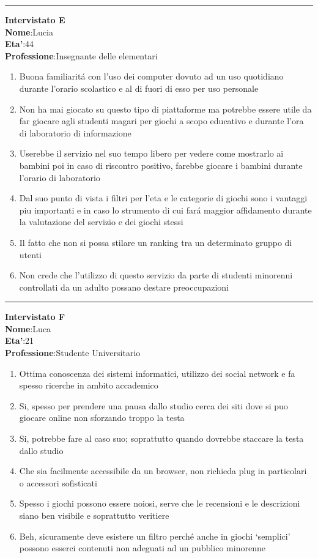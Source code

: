 \documentclass[../Report.tex]{subfiles}
\begin{document}
    \hrule
    \textbf{Intervistato E}\\

    \textbf{Nome}:Lucia\\
    \textbf{Eta'}:44\\
    \textbf{Professione}:Insegnante delle elementari\\

    \begin{enumerate}
        \item Buona familiaritá con l’uso dei computer dovuto ad un uso quotidiano durante l’orario scolastico e al di fuori di esso per uso personale
        \item Non ha mai giocato su questo tipo di piattaforme ma potrebbe essere utile da far giocare agli studenti magari per giochi a scopo educativo e durante l’ora di laboratorio di informazione
        \item Userebbe il servizio nel suo tempo libero per vedere come mostrarlo ai bambini poi in caso di riscontro positivo, farebbe giocare i bambini durante l’orario di laboratorio
        \item Dal suo punto di vista i filtri per l’eta e le categorie di giochi sono i vantaggi piu importanti e in caso lo strumento di cui fará maggior affidamento durante la valutazione del servizio e dei giochi stessi
        \item Il fatto che non si possa stilare un ranking tra un determinato gruppo di utenti
        \item Non crede che l’utilizzo di questo servizio da parte di studenti minorenni controllati da un adulto possano destare preoccupazioni
    \end{enumerate}
    \hrule
    \textbf{Intervistato F}\\
    
    \textbf{Nome}:Luca\\
    \textbf{Eta'}:21\\
    \textbf{Professione}:Studente Universitario\\

    \begin{enumerate}
        \item Ottima conoscenza dei sistemi informatici, utilizzo dei social network e fa spesso ricerche in ambito accademico
        \item Si, spesso per prendere una pausa dallo studio cerca dei siti dove si puo giocare online non sforzando troppo la testa
        \item Si, potrebbe fare al caso suo; soprattutto quando dovrebbe staccare la testa dallo studio
        \item Che sia facilmente accessibile da un browser, non richieda plug in particolari o accessori sofisticati
        \item Spesso i giochi possono essere noiosi, serve che le recensioni e le descrizioni siano ben visibile e soprattutto veritiere
        \item Beh, sicuramente deve esistere un filtro perché anche in giochi ‘semplici’ possono esserci contenuti non adeguati ad un pubblico minorenne
    \end{enumerate}
    
\end{document}
